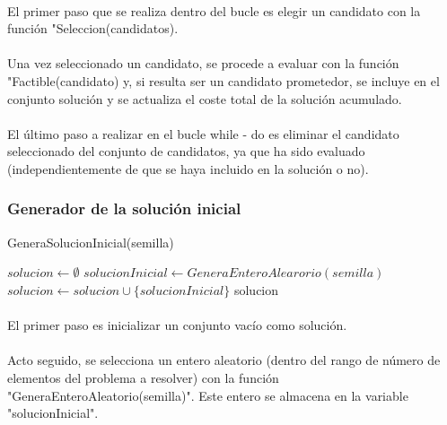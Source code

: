 \documentclass{article}
\begin{document}
		\paragraph{}El primer paso que se realiza dentro del bucle es elegir un candidato con la función "Seleccion(candidatos).
		
		\paragraph{}Una vez seleccionado un candidato, se procede a evaluar con la función "Factible(candidato) y, si resulta ser un candidato prometedor, se incluye en el conjunto solución y se actualiza el coste total de la solución acumulado.
		
		\paragraph{}El último paso a realizar en el bucle while - do es eliminar el candidato seleccionado del conjunto de candidatos, ya que ha sido evaluado (independientemente de que se haya incluido en la solución o no).
	
	

	\subsubsection{Generador de la solución inicial}
		\begin{algorithm}[H]
			\caption{GeneraSolucionInicial(semilla)}
			\begin{algorithmic}
				\STATE $solucion \leftarrow \emptyset$
				\STATE $solucionInicial \leftarrow GeneraEnteroAlearorio(semilla)$
				\STATE $solucion \leftarrow solucion \cup \{solucionInicial\}$
				\RETURN solucion
			\end{algorithmic}
		\end{algorithm}
	
		\paragraph{}El primer paso es inicializar un conjunto vacío como solución.
			
		\paragraph{}Acto seguido, se selecciona un entero aleatorio (dentro del rango de número de elementos del problema a resolver) con la función "GeneraEnteroAleatorio(semilla)". Este entero se almacena en la variable "solucionInicial".
		
\end{document}
